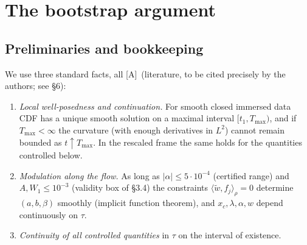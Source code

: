 \documentclass[11pt]{article}
\theoremstyle{definition}
\theoremstyle{remark}
\newcommand{\tA}{\textsc{[A]}}
\newcommand{\ip}[2]{\langle #1,#2\rangle}
\begin{document}
\section{The bootstrap argument}

\subsection{Preliminaries and bookkeeping}
We use three standard facts, all \tA\ (literature, to be cited precisely by the authors; see \S6):
\begin{enumerate}[label=(P\arabic*),leftmargin=*]
\item \emph{Local well-posedness and continuation.} For smooth closed immersed data CDF has a unique smooth solution on a maximal interval $[t_1,T_{\max})$, and if $T_{\max}<\infty$ the curvature (with enough derivatives in $L^2$) cannot remain bounded as $t\uparrow T_{\max}$. In the rescaled frame the same holds for the quantities controlled below.
\item \emph{Modulation along the flow.} As long as $|\alpha|\le5\cdot10^{-4}$ (certified range) and $A,W_1\le10^{-3}$ (validity box of \S3.4) the constraints $\ip{\tilde w}{f_j}_\rho=0$ determine $(a,b,\beta)$ smoothly (implicit function theorem), and $x_c,\lambda,\alpha,w$ depend continuously on $\tau$.
\item \emph{Continuity of all controlled quantities} in $\tau$ on the interval of existence.
\end{enumerate}
\end{document}
